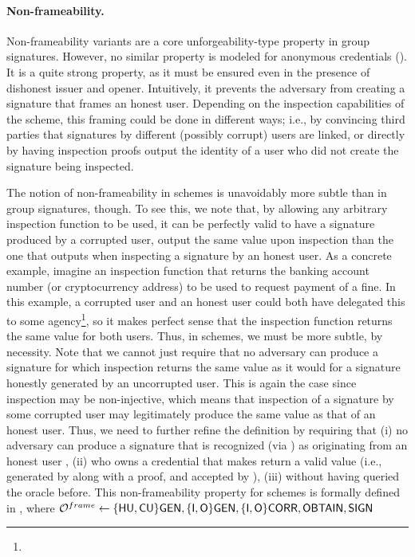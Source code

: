 \paragraph{Non-frameability.} %
Non-frameability variants are a core unforgeability-type property in group
signatures. However, no
similar property is modeled for anonymous credentials (). It is a quite strong
property, as it must be ensured even in the presence of dishonest issuer and
opener. Intuitively, it prevents the adversary from creating a signature that
frames an honest user. Depending on the inspection capabilities of the scheme,
this framing could be done in different ways; i.e., by convincing third parties
that signatures by different (possibly corrupt) users are linked, or directly
by having inspection proofs output the identity of a user who did not create the
signature being inspected.

The notion of non-frameability in \UAS schemes is unavoidably more subtle than
in group signatures, though. To see this, we note that, by allowing any
arbitrary inspection function \finsp to be used, it can be perfectly valid to
have a signature produced by a corrupted user, output the same \y value upon
inspection than the one that \finsp outputs when inspecting a signature by an
honest user. As a concrete example, imagine an inspection function that returns
the banking account number (or cryptocurrency address) to be used to request
payment of a fine. In this example, a corrupted user and an honest user could
both have delegated this to some agency\footnote{}, so it makes perfect sense
that the inspection function returns the same value for both users.
%
Thus, in \UAS schemes, we must be more subtle, by necessity. Note that we cannot
just require that no adversary can produce a signature for which inspection
returns the same value as it would for a signature honestly generated by an
uncorrupted user. This is again the case since inspection may be non-injective,
which means that inspection of a signature by some corrupted user may
legitimately produce the same value as that of an honest user. Thus, we need
to further refine the definition by requiring that (i) no adversary can produce
a signature that is recognized (via \Identify) as originating from an honest
user \uid, (ii) who owns a credential that makes \finsp return a valid \y value
(i.e., generated by \Inspect along with a proof, and accepted by \Judge), (iii)
without having queried the \SIGN oracle before. This non-frameability property
for \UAS schemes is formally defined in , where
$\mathcal{O}^{frame} \gets \lbrace\mathsf{HU},\mathsf{CU}\rbrace\mathsf{GEN},
\lbrace\mathsf{I},\mathsf{O}\rbrace\mathsf{GEN},\lbrace\mathsf{I},\mathsf{O}\rbrace\mathsf{CORR},\mathsf{OBTAIN},\mathsf{SIGN}$

